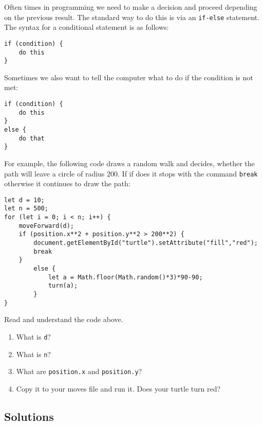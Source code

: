 \documentclass[11pt,a4paper]{report}
\begin{document}
Often times in programming we need to make a decision and proceed depending on the previous result.  The standard way to do this is via an \verb|if-else| statement.  The syntax for a conditional statement is as follows:
\begin{verbatim}
if (condition) {
    do this
}
\end{verbatim}
Sometimes we also want to tell the computer what to do if the condition is not met:
\begin{verbatim}
if (condition) {
    do this
}
else {
    do that
}
\end{verbatim}
For example, the following code draws a random walk and decides, whether the path will leave a circle of radius 200. If if does it stops with the command \verb|break| otherwise it continues to draw the path:
\begin{verbatim}
let d = 10;
let n = 500;
for (let i = 0; i < n; i++) {
    moveForward(d);
    if (position.x**2 + position.y**2 > 200**2) {
        document.getElementById("turtle").setAttribute("fill","red");
        break
    }
        else {
            let a = Math.floor(Math.random()*3)*90-90;
            turn(a);
        }
}
\end{verbatim}

\begin{ex}
Read and understand the code above. 
\begin{enumerate}
\item What is \verb|d|?
\item What is \verb|n|?
\item What are \verb|position.x| and \verb|position.y|?
\item Copy it to your moves file and run it. Does your turtle turn red?
\end{enumerate}
\end{ex}

\newpage

\subsection*{Solutions}
\printcursols
\end{document}
